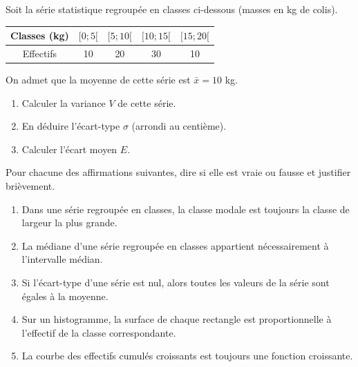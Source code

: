 \documentclass[11pt]{article}
\begin{document}
\begin{exercice}
Soit la série statistique regroupée en classes ci-dessous (masses en kg de colis).
\begin{center}
\begin{tabular}{|c|c|c|c|c|}
\hline
Classes (kg) & $[0;5[$ & $[5;10[$ & $[10;15[$ & $[15;20[$ \\ \hline
Effectifs & 10 & 20 & 30 & 10 \\ \hline
\end{tabular}
\end{center}
On admet que la moyenne de cette série est $\bar{x} = 10$ kg.
\begin{enumerate}
    \item Calculer la variance $V$ de cette série.
    \item En déduire l'écart-type $\sigma$ (arrondi au centième).
    \item Calculer l'écart moyen $E$.
\end{enumerate}
\end{exercice}

\begin{exercice}
Pour chacune des affirmations suivantes, dire si elle est vraie ou fausse et justifier brièvement.
\begin{enumerate}
    \item Dans une série regroupée en classes, la classe modale est toujours la classe de largeur la plus grande.
    \item La médiane d'une série regroupée en classes appartient nécessairement à l'intervalle médian.
    \item Si l'écart-type d'une série est nul, alors toutes les valeurs de la série sont égales à la moyenne.
    \item Sur un histogramme, la surface de chaque rectangle est proportionnelle à l'effectif de la classe correspondante.
    \item La courbe des effectifs cumulés croissants est toujours une fonction croissante.
\end{enumerate}
\end{exercice}
\end{document}

